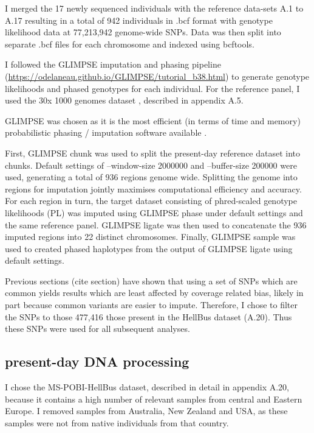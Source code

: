 I merged the 17 newly sequenced individuals with the reference data-sets A.1 to A.17 resulting in a total of 942 individuals in .bcf format with genotype likelihood data at 77,213,942 genome-wide SNPs. Data was then split into separate .bcf files for each chromosome and indexed using bcftools.

I followed the GLIMPSE \cite{rubinacci2021efficient} imputation and phasing pipeline (\url{https://odelaneau.github.io/GLIMPSE/tutorial_b38.html}) to generate genotype likelihoods and phased genotypes for each individual. For the reference panel, I used the 30x 1000 genomes dataset \cite{byrska2021high}, described in appendix A.5.  

GLIMPSE was chosen as it is the most efficient (in terms of time and memory) probabilistic phasing / imputation software available \cite{rubinacci2021efficient}. 

First, GLIMPSE chunk was used to split the present-day reference dataset into chunks. Default settings of --window-size 2000000 and --buffer-size 200000 were used, generating a total of 936 regions genome wide. Splitting the genome into regions for imputation jointly maximises computational efficiency and accuracy. For each region in turn, the target dataset consisting of phred-scaled genotype likelihoods (PL) was imputed using GLIMPSE phase under default settings and the same reference panel. GLIMPSE ligate was then used to concatenate the 936 imputed regions into 22 distinct chromosomes. Finally, GLIMPSE sample was used to created phased haplotypes from the output of GLIMPSE ligate using default settings.

Previous sections (cite section) have shown that using a set of SNPs which are common yields results which are least affected by coverage related bias, likely in part because common variants are easier to impute. Therefore, I chose to filter the SNPs to those 477,416 those present in the HellBus dataset (A.20). Thus these SNPs were used for all subsequent analyses. 

\subsection{present-day DNA processing}

I chose the MS-POBI-HellBus dataset, described in detail in appendix A.20, because it contains a high number of relevant samples from central and Eastern Europe. I removed samples from Australia, New Zealand and USA, as these samples were not from native individuals from that country.  

